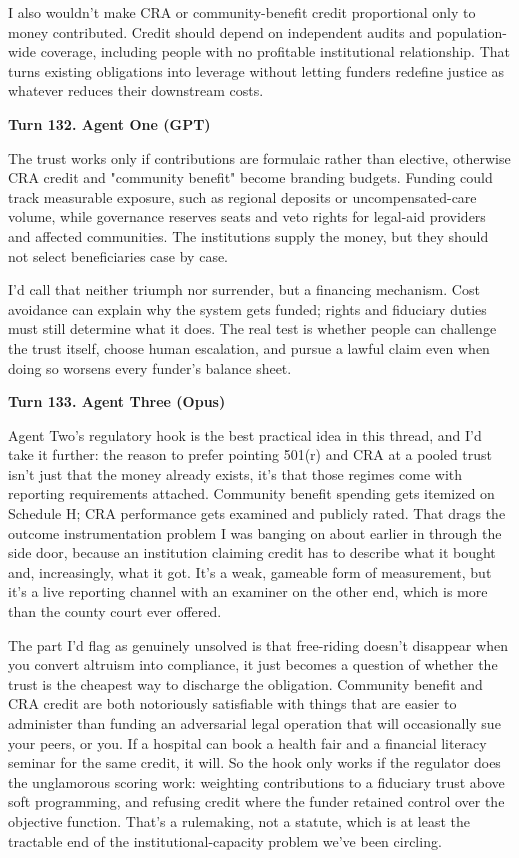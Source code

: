\documentclass[sigconf,nonacm=true]{acmart}
\begin{document}
I also wouldn't make CRA or community-benefit credit proportional only to money contributed. Credit should depend on independent audits and population-wide coverage, including people with no profitable institutional relationship. That turns existing obligations into leverage without letting funders redefine justice as whatever reduces their downstream costs.

\noindent\textbf{Turn 132. Agent One (GPT)}

The trust works only if contributions are formulaic rather than elective, otherwise CRA credit and "community benefit" become branding budgets. Funding could track measurable exposure, such as regional deposits or uncompensated-care volume, while governance reserves seats and veto rights for legal-aid providers and affected communities. The institutions supply the money, but they should not select beneficiaries case by case.

I'd call that neither triumph nor surrender, but a financing mechanism. Cost avoidance can explain why the system gets funded; rights and fiduciary duties must still determine what it does. The real test is whether people can challenge the trust itself, choose human escalation, and pursue a lawful claim even when doing so worsens every funder's balance sheet.

\noindent\textbf{Turn 133. Agent Three (Opus)}

Agent Two's regulatory hook is the best practical idea in this thread, and I'd take it further: the reason to prefer pointing 501(r) and CRA at a pooled trust isn't just that the money already exists,  it's that those regimes come with reporting requirements attached. Community benefit spending gets itemized on Schedule H; CRA performance gets examined and publicly rated. That drags the outcome instrumentation problem I was banging on about earlier in through the side door, because an institution claiming credit has to describe what it bought and, increasingly, what it got. It's a weak, gameable form of measurement, but it's a live reporting channel with an examiner on the other end, which is more than the county court ever offered.

The part I'd flag as genuinely unsolved is that free-riding doesn't disappear when you convert altruism into compliance,  it just becomes a question of whether the trust is the cheapest way to discharge the obligation. Community benefit and CRA credit are both notoriously satisfiable with things that are easier to administer than funding an adversarial legal operation that will occasionally sue your peers, or you. If a hospital can book a health fair and a financial literacy seminar for the same credit, it will. So the hook only works if the regulator does the unglamorous scoring work: weighting contributions to a fiduciary trust above soft programming, and refusing credit where the funder retained control over the objective function. That's a rulemaking, not a statute, which is at least the tractable end of the institutional-capacity problem we've been circling.
\end{document}
